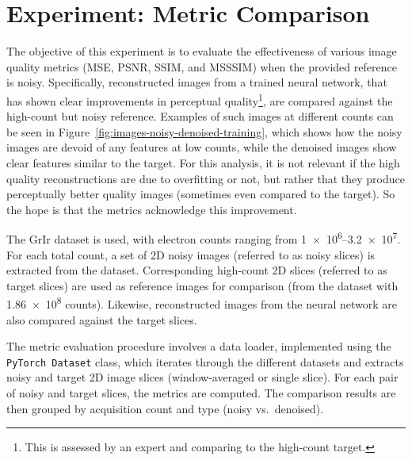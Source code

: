 \FloatBarrier
\section{Experiment: Metric Comparison}\label{sec:metric_comparison_experiment}

The objective of this experiment is to evaluate the effectiveness of various image quality metrics (\gls{MSE}, \gls{PSNR}, \gls{SSIM}, and \gls{MSSSIM}) when the provided reference is noisy. Specifically, reconstructed images from a trained neural network, that has shown clear improvements in perceptual quality\footnote{This is assessed by an expert and comparing to the high-count target.}, are compared against the high-count but noisy reference. Examples of such images at different counts can be seen in Figure~\ref{fig:images-noisy-denoised-training}, which shows how the noisy images are devoid of any features at low counts, while the denoised images show clear features similar to the target. For this analysis, it is not relevant if the high quality reconstructions are due to overfitting or not, but rather that they produce perceptually better quality images (sometimes even compared to the target). So the hope is that the metrics acknowledge this improvement.


The \gls{GrIr} dataset is used, with electron counts ranging from \numrange{1e6}{3.2e7}. For each total count, a set of 2D noisy images (referred to as noisy slices) is extracted from the dataset. Corresponding high-count 2D slices (referred to as target slices) are used as reference images for comparison (from the dataset with \num{1.86e8} counts). Likewise, reconstructed images from the neural network are also compared against the target slices.

The metric evaluation procedure involves a data loader, implemented using the \texttt{PyTorch Dataset} class, which iterates through the different datasets and extracts noisy and target 2D image slices (window-averaged or single slice). For each pair of noisy and target slices, the metrics are computed. The comparison results are then grouped by acquisition count and type (noisy vs.\ denoised).

